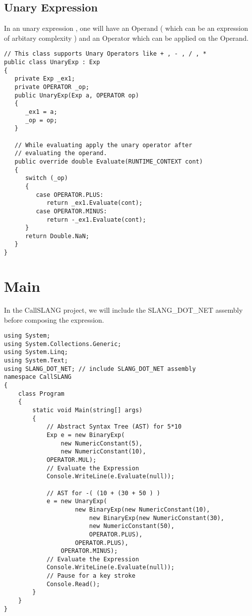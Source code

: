\subsection{Unary Expression}
In an unary expression , one will have an Operand ( which can be an expression of arbitary complexity ) and an Operator which can be applied on the Operand.
\lstset{style=csharp}
\begin{lstlisting}
// This class supports Unary Operators like + , - , / , *
public class UnaryExp : Exp
{
   private Exp _ex1;
   private OPERATOR _op;
   public UnaryExp(Exp a, OPERATOR op)
   {
      _ex1 = a;
      _op = op;
   }

   // While evaluating apply the unary operator after 
   // evaluating the operand.
   public override double Evaluate(RUNTIME_CONTEXT cont)
   {
      switch (_op)
      {
         case OPERATOR.PLUS:
            return _ex1.Evaluate(cont);
         case OPERATOR.MINUS:
            return -_ex1.Evaluate(cont);
      }
      return Double.NaN;
   }
}
\end{lstlisting}
\clearpage 
\section{Main}
In the CallSLANG project, we will include the SLANG\_DOT\_NET assembly before composing the expression.
\\
\lstset{style=csharp}
\begin{lstlisting}
using System;
using System.Collections.Generic;
using System.Linq;
using System.Text;
using SLANG_DOT_NET; // include SLANG_DOT_NET assembly
namespace CallSLANG
{
	class Program
	{
		static void Main(string[] args)
		{
			// Abstract Syntax Tree (AST) for 5*10
			Exp e = new BinaryExp(
				new NumericConstant(5),
				new NumericConstant(10),
			OPERATOR.MUL);
			// Evaluate the Expression
			Console.WriteLine(e.Evaluate(null));

			// AST for -( (10 + (30 + 50 ) )
			e = new UnaryExp(
					new BinaryExp(new NumericConstant(10),
						new BinaryExp(new NumericConstant(30),
						new NumericConstant(50),
						OPERATOR.PLUS),
					OPERATOR.PLUS),
				OPERATOR.MINUS);
			// Evaluate the Expression
			Console.WriteLine(e.Evaluate(null));
			// Pause for a key stroke
			Console.Read();
		}
	} 
}
\end{lstlisting}
\clearpage 